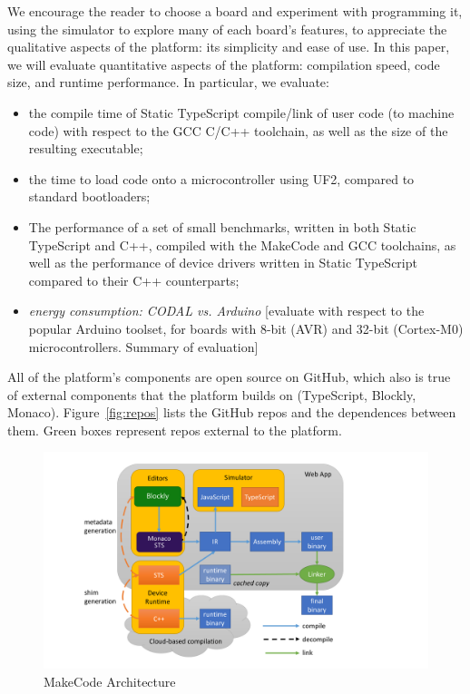We encourage the reader to choose a board and experiment with programming it, using the simulator to explore many 
of each board's features, to appreciate the qualitative aspects of the platform: its simplicity and ease of use.  In this 
paper, we will evaluate quantitative aspects of the platform: 
compilation speed, code size, and runtime performance.  In particular, we evaluate:
\begin{itemize}
\item the compile time of Static TypeScript compile/link of user code (to machine code) with respect 
      to the GCC C/C++ toolchain, as well as the size of the resulting executable;
\item the time to load code onto a microcontroller using UF2, compared to standard bootloaders; 
\item The performance of a set of small benchmarks, written in both Static TypeScript and C++,
      compiled with the MakeCode and GCC toolchains, as well as the performance of device drivers
      written in Static TypeScript compared to their C++ counterparts;
\item \emph{energy consumption: CODAL vs. Arduino}
[evaluate with respect to the popular Arduino toolset, for boards with 8-bit (AVR) and 32-bit (Cortex-M0) microcontrollers. 
Summary of evaluation]
\end{itemize}

All of the platform's components are open source on GitHub, 
which also is true of external components that the platform
builds on (TypeScript, Blockly, Monaco). Figure~\ref{fig:repos}
lists the GitHub repos and the dependences between them. Green
boxes represent repos external to the platform.

\begin{figure}[t]
      \includegraphics[width=5.5in]{makecodeFig.pdf}
  \caption{\label{fig:makecode}MakeCode Architecture}
  \end{figure}
  
